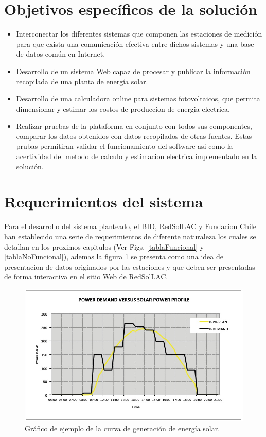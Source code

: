 \section{Objetivos específicos de la solución}
\begin{itemize}
\item Interconectar los diferentes sistemas que componen las estaciones de medición para que exista una comunicación efectiva entre dichos sistemas y una base de datos común en Internet.
\item Desarrollo de un sistema Web capaz de procesar y publicar la información recopilada de una planta de energía solar.
\item Desarrollo de una calculadora online para sistemas fotovoltaicos, que permita dimensionar y estimar los costos de produccion de energia electrica.
\item Realizar pruebas de la plataforma en conjunto con todos sus componentes, comparar los datos obtenidos con datos recopilados de otras fuentes. Estas prubas permitiran validar el funcionamiento del software asi como la acertividad del metodo de calculo y estimacion electrica implementado en la solución.
\end{itemize}

\section{Requerimientos del sistema}
Para el desarrollo del sistema planteado, el BID, RedSolLAC y Fundacion Chile han establecido una serie de requerimientos de diferente naturaleza los cuales se detallan en los proximos capitulos (Ver Figs. \ref{tablaFuncional} y \ref{tablaNoFuncional}), ademas la figura \ref{fig:demanda} se presenta como una idea de presentacion de datos originados por las estaciones y que deben ser presentadas de forma interactiva en el sitio Web de RedSolLAC.

\begin{figure}[h!]
        \centering
        \includegraphics[scale=0.5]{images/demandaGeneracionSubSole}
        \caption{Gráfico de ejemplo de la curva de generación de energía solar.}
	\label{fig:demanda}
\end{figure}

